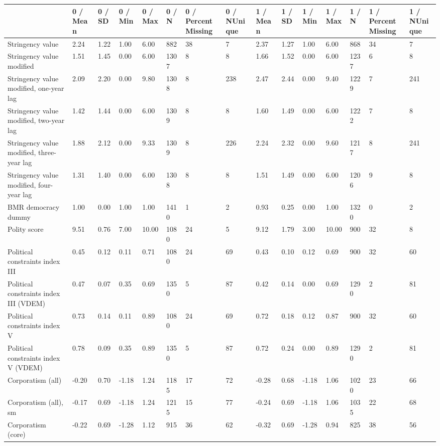 
\begin{longtable}{lllllllllllllll}
\toprule
  & 0 / Mean & 0 / SD & 0 / Min & 0 / Max & 0 / N & 0 / PercentMissing & 0 / NUnique & 1 / Mean & 1 / SD & 1 / Min & 1 / Max & 1 / N & 1 / PercentMissing & 1 / NUnique\\
\midrule
Stringency value & 2.24 & 1.22 & 1.00 & 6.00 & 882 & 38 & 7 & 2.37 & 1.27 & 1.00 & 6.00 & 868 & 34 & 7\\
Stringency value modified & 1.51 & 1.45 & 0.00 & 6.00 & 1307 & 8 & 8 & 1.66 & 1.52 & 0.00 & 6.00 & 1237 & 6 & 8\\
Stringency value modified, one-year lag & 2.09 & 2.20 & 0.00 & 9.80 & 1308 & 8 & 238 & 2.47 & 2.44 & 0.00 & 9.40 & 1229 & 7 & 241\\
Stringency value modified, two-year lag & 1.42 & 1.44 & 0.00 & 6.00 & 1309 & 8 & 8 & 1.60 & 1.49 & 0.00 & 6.00 & 1222 & 7 & 8\\
Stringency value modified, three-year lag & 1.88 & 2.12 & 0.00 & 9.33 & 1309 & 8 & 226 & 2.24 & 2.32 & 0.00 & 9.60 & 1217 & 8 & 241\\
\addlinespace
Stringency value modified, four-year lag & 1.31 & 1.40 & 0.00 & 6.00 & 1308 & 8 & 8 & 1.51 & 1.49 & 0.00 & 6.00 & 1206 & 9 & 8\\
BMR democracy dummy & 1.00 & 0.00 & 1.00 & 1.00 & 1410 & 1 & 2 & 0.93 & 0.25 & 0.00 & 1.00 & 1320 & 0 & 2\\
Polity score & 9.51 & 0.76 & 7.00 & 10.00 & 1080 & 24 & 5 & 9.12 & 1.79 & 3.00 & 10.00 & 900 & 32 & 8\\
Political constraints index III & 0.45 & 0.12 & 0.11 & 0.71 & 1080 & 24 & 69 & 0.43 & 0.10 & 0.12 & 0.69 & 900 & 32 & 60\\
Political constraints index III (VDEM) & 0.47 & 0.07 & 0.35 & 0.69 & 1350 & 5 & 87 & 0.42 & 0.14 & 0.00 & 0.69 & 1290 & 2 & 81\\
\addlinespace
Political constraints index V & 0.73 & 0.14 & 0.11 & 0.89 & 1080 & 24 & 69 & 0.72 & 0.18 & 0.12 & 0.87 & 900 & 32 & 60\\
Political constraints index V (VDEM) & 0.78 & 0.09 & 0.35 & 0.89 & 1350 & 5 & 87 & 0.72 & 0.24 & 0.00 & 0.89 & 1290 & 2 & 81\\
Corporatism (all) & -0.20 & 0.70 & -1.18 & 1.24 & 1185 & 17 & 72 & -0.28 & 0.68 & -1.18 & 1.06 & 1020 & 23 & 66\\
Corporatism (all), sm & -0.17 & 0.69 & -1.18 & 1.24 & 1215 & 15 & 77 & -0.24 & 0.69 & -1.18 & 1.06 & 1035 & 22 & 68\\
Corporatism (core) & -0.22 & 0.69 & -1.28 & 1.12 & 915 & 36 & 62 & -0.32 & 0.69 & -1.28 & 0.94 & 825 & 38 & 56\\

\end{longtable}
